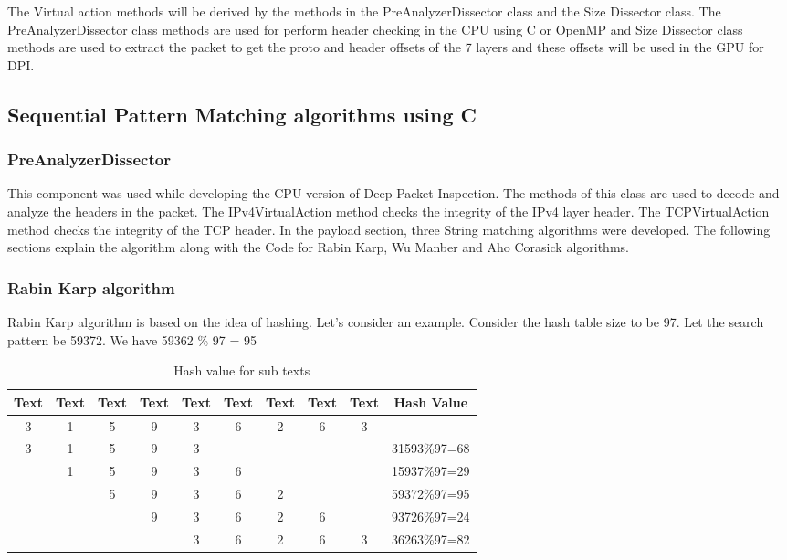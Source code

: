 The Virtual action methods will be derived by the methods in the PreAnalyzerDissector class and the Size Dissector class. The PreAnalyzerDissector class methods are used for perform header checking in the CPU using C or OpenMP and Size Dissector class methods are used to extract the packet to get the proto and header offsets of the 7 layers and these offsets will be used in the GPU for DPI.

\subsection{Sequential Pattern Matching algorithms using C}

\subsubsection{PreAnalyzerDissector}
This component was used while developing the CPU version of Deep Packet Inspection. The methods of this class are used to decode and analyze the headers in the packet. The IPv4VirtualAction method checks the integrity of the IPv4 layer header. The TCPVirtualAction method checks the integrity of the TCP header. In the payload section, three String matching algorithms were developed. The following sections explain the algorithm along with the Code for Rabin Karp, Wu Manber and Aho Corasick algorithms.

\subsubsection{Rabin Karp algorithm}

Rabin Karp algorithm is based on the idea of hashing. Let’s consider an example.
Consider the hash table size to be 97. Let the search pattern be 59372. We have 59362 \% 97 = 95

\begin {table}[h]
\caption {Hash value for sub texts} \label{tab:title} 
\begin{tabular}{|c|c|c|c|c|c|c|c|c|c|} 
	\midrule
	Text & Text & Text & Text & Text & Text & Text & Text & Text & Hash Value\\
	\midrule
	3 & 1 & 5 & 9 & 3 & 6 & 2 & 6 & 3 \\
	\midrule
	3 & 1 & 5 & 9 & 3 & & & & & 31593\%97=68 \\
	\midrule
	 & 1 & 5 & 9 & 3 & 6 & & & & 15937\%97=29\\
	\midrule
	 & 	& 5 & 9 & 3 & 6 & 2 & & & 59372\%97=95 \\
	\midrule
	 & 	&  & 9 & 3 & 6 & 2 & 6 & & 93726\%97=24 \\
	\midrule
	 & 	&  &   & 3 & 6 & 2 & 6 & 3 & 36263\%97=82 \\
	\midrule
\end{tabular}
\end {table}


